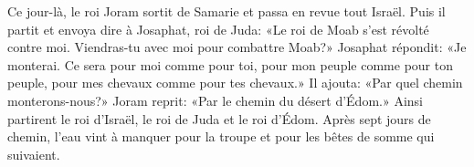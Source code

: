 Ce jour-là, le roi Joram sortit de Samarie et passa en revue tout Israël.
Puis il partit et envoya dire à Josaphat, roi de Juda:
	«Le roi de Moab s’est révolté contre moi.
Viendras-tu avec moi pour combattre Moab?»
	Josaphat répondit: «Je monterai.
Ce sera pour moi comme pour toi,
	pour mon peuple comme pour ton peuple, pour mes chevaux comme pour tes chevaux.»
Il ajouta: «Par quel chemin monterons-nous?»
	Joram reprit: «Par le chemin du désert d’Édom.»
Ainsi partirent le roi d’Israël, le roi de Juda et le roi d’Édom.
Après sept jours de chemin,
	l’eau vint à manquer pour la troupe et pour les bêtes de somme qui suivaient.
